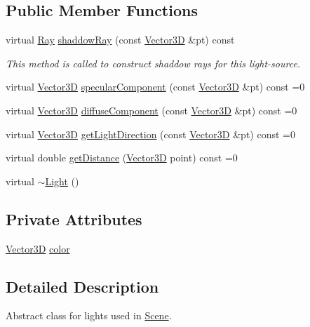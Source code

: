 \subsection*{Public Member Functions}
\begin{DoxyCompactItemize}
\item 
virtual \hyperlink{classRay}{Ray} \hyperlink{classLight_a840602e294c62366a0699e8a38c447bd}{shaddow\+Ray} (const \hyperlink{classVector3D}{Vector3D} \&pt) const 
\begin{DoxyCompactList}\small\item\em This method is called to construct shaddow rays for this light-\/source. \end{DoxyCompactList}\item 
virtual \hyperlink{classVector3D}{Vector3D} \hyperlink{classLight_a2a4cdf8081c2cab02757c2464610a32f}{specular\+Component} (const \hyperlink{classVector3D}{Vector3D} \&pt) const =0
\item 
virtual \hyperlink{classVector3D}{Vector3D} \hyperlink{classLight_af5dc859ada149ca54ec5088e1c33deb4}{diffuse\+Component} (const \hyperlink{classVector3D}{Vector3D} \&pt) const =0
\item 
virtual \hyperlink{classVector3D}{Vector3D} \hyperlink{classLight_ac075908cf22e9ca9f289c1226d133664}{get\+Light\+Direction} (const \hyperlink{classVector3D}{Vector3D} \&pt) const =0
\item 
virtual double \hyperlink{classLight_a4a7a5a9d4fc67da122c3ce75f6075093}{get\+Distance} (\hyperlink{classVector3D}{Vector3D} point) const =0
\item 
virtual \hyperlink{classLight_abe675054027c4b4a4f3e9a31d330931f}{$\sim$\+Light} ()
\end{DoxyCompactItemize}
\subsection*{Private Attributes}
\begin{DoxyCompactItemize}
\item 
\hyperlink{classVector3D}{Vector3D} \hyperlink{classLight_aea5f05e83e7f64b0a9360a52bcef2250}{color}
\end{DoxyCompactItemize}


\subsection{Detailed Description}
Abstract class for lights used in \hyperlink{classScene}{Scene}. 

